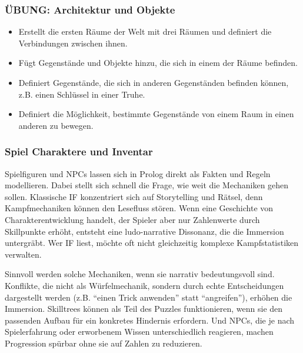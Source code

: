\documentclass[parskip=half,a4paper,11pt]{scrreprt}
\begin{document}
\subsubsection{ÜBUNG: Architektur und Objekte}

\begin{itemize}
    \item Erstellt die ersten Räume der Welt mit drei Räumen und definiert die Verbindungen zwischen ihnen.
    \item Fügt Gegenstände und Objekte hinzu, die sich in einem der Räume befinden.
    \item Definiert Gegenstände, die sich in anderen Gegenständen befinden können, z.B. einen Schlüssel in einer Truhe.
    \item Definiert die Möglichkeit, bestimmte Gegenstände von einem Raum in einen anderen zu bewegen.
\end{itemize}

\subsubsection{Spiel Charaktere und Inventar}

Spielfiguren und NPCs lassen sich in Prolog direkt als Fakten und Regeln modellieren. Dabei stellt sich schnell die Frage, wie weit die Mechaniken gehen sollen. Klassische IF konzentriert sich auf Storytelling und Rätsel, denn Kampfmechaniken können den Lesefluss stören. Wenn eine Geschichte von Charakterentwicklung handelt, der Spieler aber nur Zahlenwerte durch Skillpunkte erhöht, entsteht eine ludo-narrative Dissonanz, die die Immersion untergräbt. Wer IF liest, möchte oft nicht gleichzeitig komplexe Kampfstatistiken verwalten. 

Sinnvoll werden solche Mechaniken, wenn sie narrativ bedeutungsvoll sind. Konflikte, die nicht als Würfelmechanik, sondern durch echte Entscheidungen dargestellt werden (z.B. \enquote{einen Trick anwenden} statt \enquote{angreifen}), erhöhen die Immersion. Skilltrees können als Teil des Puzzles funktionieren, wenn sie den passenden Aufbau für ein konkretes Hindernis erfordern. Und NPCs, die je nach Spielerfahrung oder erworbenem Wissen unterschiedlich reagieren, machen Progression spürbar ohne sie auf Zahlen zu reduzieren.
\end{document}
